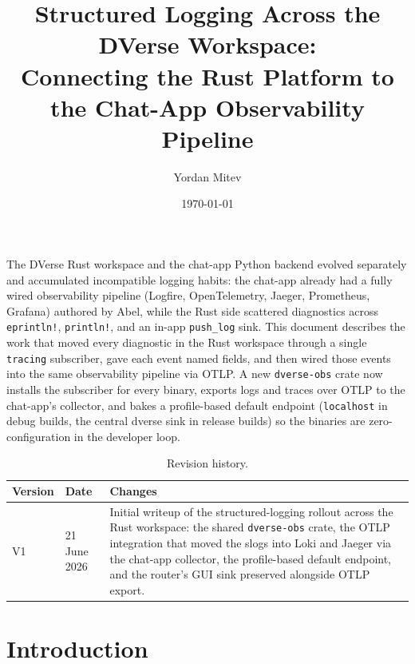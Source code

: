 \documentclass[11pt,a4paper]{article}
\title{%
  \vspace{-1cm}
  {\LARGE\bfseries Structured Logging Across the DVerse Workspace:\\
  Connecting the Rust Platform to the Chat-App Observability Pipeline}
}
\author{Yordan Mitev}
\date{\today}
\begin{document}
\sloppy
\maketitle
\thispagestyle{fancy}

\begin{abstractbox}
  The DVerse Rust workspace and the chat-app Python backend
  evolved separately and accumulated incompatible logging habits:
  the chat-app already had a fully wired observability pipeline
  (Logfire, OpenTelemetry, Jaeger, Prometheus, Grafana) authored
  by Abel, while the Rust side scattered diagnostics across
  \texttt{eprintln!}, \texttt{println!}, and an in-app
  \texttt{push\_log} sink. This document describes the work that
  moved every diagnostic in the Rust workspace through a single
  \texttt{tracing} subscriber, gave each event named fields, and
  then wired those events into the same observability pipeline
  via OTLP. A new \texttt{dverse-obs} crate now installs the
  subscriber for every binary, exports logs and traces over OTLP
  to the chat-app's collector, and bakes a profile-based default
  endpoint (\texttt{localhost} in debug builds, the central
  dverse sink in release builds) so the binaries are
  zero-configuration in the developer loop.
\end{abstractbox}

\vspace{1em}

\begin{table}[H]
  \centering
  \small
  \begin{tabular}{|l|l|p{7.5cm}|}
    \hline
    \rowcolor{gray!15}
    \textbf{Version} & \textbf{Date} & \textbf{Changes} \\
    \hline
    V1 & 21 June 2026 & Initial writeup of the structured-logging
    rollout across the Rust workspace: the shared
    \texttt{dverse-obs} crate, the OTLP integration that moved
    the slogs into Loki and Jaeger via the chat-app collector,
    the profile-based default endpoint, and the router's GUI
    sink preserved alongside OTLP export. \\
    \hline
  \end{tabular}
  \caption{Revision history.}
  \label{tab:logging-history}
\end{table}

\newpage
\tableofcontents

\newpage
\section{Introduction}
\end{document}
